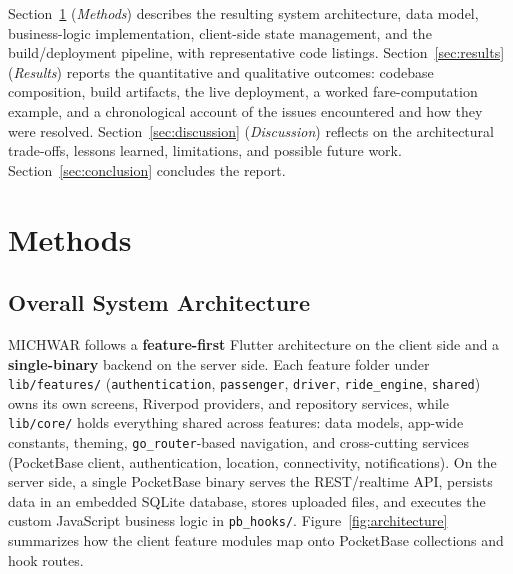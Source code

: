 \documentclass[11pt,a4paper]{article}
\begin{document}
Section~\ref{sec:methods} (\textit{Methods}) describes the resulting system
architecture, data model, business-logic implementation, client-side state
management, and the build/deployment pipeline, with representative code
listings. Section~\ref{sec:results} (\textit{Results}) reports the
quantitative and qualitative outcomes: codebase composition, build
artifacts, the live deployment, a worked fare-computation example, and a
chronological account of the issues encountered and how they were resolved.
Section~\ref{sec:discussion} (\textit{Discussion}) reflects on the
architectural trade-offs, lessons learned, limitations, and possible future
work. Section~\ref{sec:conclusion} concludes the report.


\section{Methods}
\label{sec:methods}

\subsection{Overall System Architecture}
\label{sec:architecture}

MICHWAR follows a \textbf{feature-first} Flutter architecture on the client
side and a \textbf{single-binary} backend on the server side. Each feature
folder under \texttt{lib/features/} (\texttt{authentication}, \texttt{passenger},
\texttt{driver}, \texttt{ride\_engine}, \texttt{shared}) owns its own screens,
Riverpod providers, and repository services, while \texttt{lib/core/} holds
everything shared across features: data models, app-wide constants, theming,
\texttt{go\_router}-based navigation, and cross-cutting services (PocketBase
client, authentication, location, connectivity, notifications). On the
server side, a single PocketBase binary serves the REST/realtime API,
persists data in an embedded SQLite database, stores uploaded files, and
executes the custom JavaScript business logic in \texttt{pb\_hooks/}.
Figure~\ref{fig:architecture} summarizes how the client feature modules map
onto PocketBase collections and hook routes.
\end{document}
